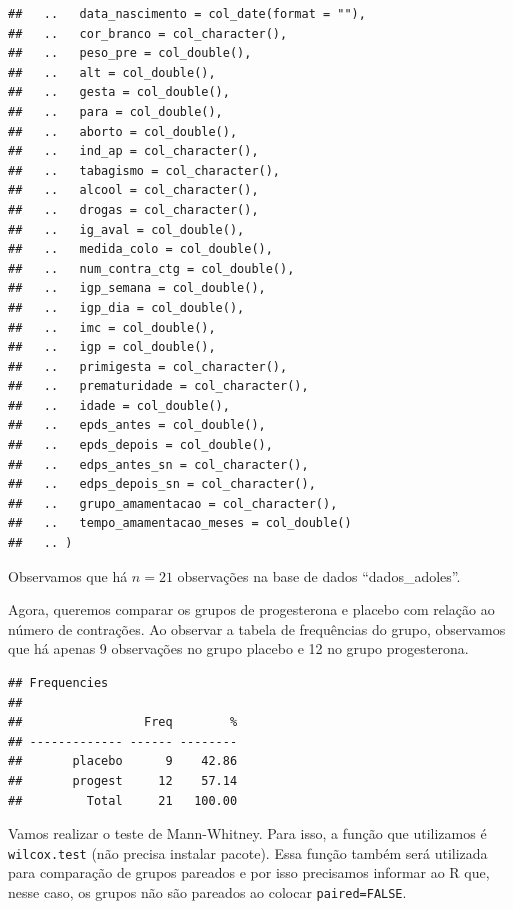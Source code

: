 \documentclass[
]{book}
\newenvironment{Shaded}{\begin{snugshade}}{\end{snugshade}}
\newcommand{\DataTypeTok}[1]{\textcolor[rgb]{0.13,0.29,0.53}{#1}}
\newcommand{\KeywordTok}[1]{\textcolor[rgb]{0.13,0.29,0.53}{\textbf{#1}}}
\newcommand{\NormalTok}[1]{#1}
\newcommand{\OperatorTok}[1]{\textcolor[rgb]{0.81,0.36,0.00}{\textbf{#1}}}
\newcommand{\OtherTok}[1]{\textcolor[rgb]{0.56,0.35,0.01}{#1}}
\begin{document}
\begin{verbatim}
##   ..   data_nascimento = col_date(format = ""),
##   ..   cor_branco = col_character(),
##   ..   peso_pre = col_double(),
##   ..   alt = col_double(),
##   ..   gesta = col_double(),
##   ..   para = col_double(),
##   ..   aborto = col_double(),
##   ..   ind_ap = col_character(),
##   ..   tabagismo = col_character(),
##   ..   alcool = col_character(),
##   ..   drogas = col_character(),
##   ..   ig_aval = col_double(),
##   ..   medida_colo = col_double(),
##   ..   num_contra_ctg = col_double(),
##   ..   igp_semana = col_double(),
##   ..   igp_dia = col_double(),
##   ..   imc = col_double(),
##   ..   igp = col_double(),
##   ..   primigesta = col_character(),
##   ..   prematuridade = col_character(),
##   ..   idade = col_double(),
##   ..   epds_antes = col_double(),
##   ..   epds_depois = col_double(),
##   ..   edps_antes_sn = col_character(),
##   ..   edps_depois_sn = col_character(),
##   ..   grupo_amamentacao = col_character(),
##   ..   tempo_amamentacao_meses = col_double()
##   .. )
\end{verbatim}

Observamos que há \(n=21\) observações na base de dados ``dados\_adoles''.

Agora, queremos comparar os grupos de progesterona e placebo com relação ao número de contrações. Ao observar a tabela de frequências do grupo, observamos que há apenas 9 observações no grupo placebo e 12 no grupo progesterona.

\begin{Shaded}
\end{Shaded}

\begin{verbatim}
## Frequencies  
## 
##                 Freq        %
## ------------- ------ --------
##       placebo      9    42.86
##       progest     12    57.14
##         Total     21   100.00
\end{verbatim}

Vamos realizar o teste de Mann-Whitney. Para isso, a função que utilizamos é \texttt{wilcox.test} (não precisa instalar pacote). Essa função também será utilizada para comparação de grupos pareados e por isso precisamos informar ao R que, nesse caso, os grupos não são pareados ao colocar \texttt{paired=FALSE}.
\end{document}
